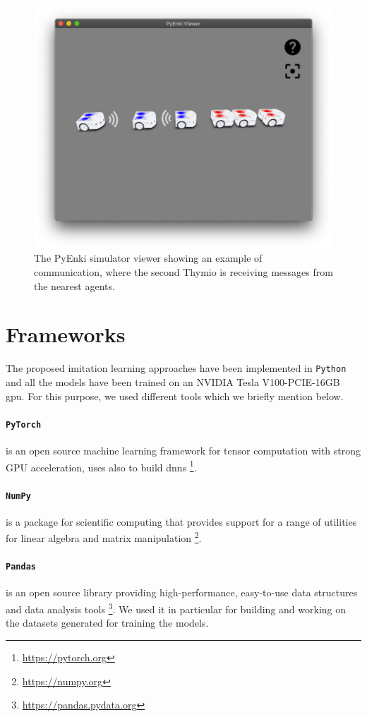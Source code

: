 \begin{figure}[!htb]
	\centering
	\includegraphics[width=.6\textwidth]{contents/images/thymio-comm}
	\caption[Example of communication with the PyEnki simulator]{The PyEnki 
	simulator viewer showing an example of communication, 
	where the second Thymio is receiving messages from the nearest agents.}
	\label{fig:thymio comm}
\end{figure}

\section{Frameworks}
\label{sec:learning}
The proposed imitation learning approaches have been implemented in 
\texttt{Python} and all the models have been trained on an NVIDIA Tesla 
V100-PCIE-16GB \gls{gpu}.
For this purpose, we used different tools which we briefly mention below.

\paragraph{\texttt{PyTorch}} is an open source machine learning framework  for 
tensor computation with strong GPU acceleration, uses also to build \glspl{dnn} 
\footnote{\url{https://pytorch.org}}.

\paragraph{\texttt{NumPy}} is a package for scientific computing that provides 
support for a range of utilities for linear algebra and matrix manipulation 
\footnote{\url{https://numpy.org}}.

\paragraph{\texttt{Pandas}} is an open source library providing 
high-performance, easy-to-use data structures and data analysis tools 
\footnote{\url{https://pandas.pydata.org}}. We used it in particular for building 
and working on the datasets generated for training the models. 

